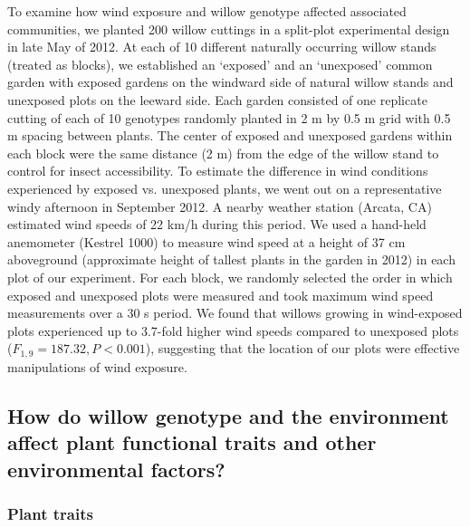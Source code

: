 \documentclass[11pt]{article}
\begin{document}
To examine how wind exposure and willow genotype affected associated
communities, we planted 200 willow cuttings in a
split-plot experimental design in late May of 2012. At each of 10
different naturally occurring willow stands (treated as blocks), we established an
`exposed' and an `unexposed' common garden with exposed gardens on the windward side of natural willow stands and unexposed plots on the leeward side. Each garden consisted of one
replicate cutting of each of 10 genotypes randomly planted in 2 m by 0.5
m grid with 0.5 m spacing between plants. The center of exposed and
unexposed gardens within each block were the same distance (2 m) from
the edge of the willow stand to control for insect accessibility. To
estimate the difference in wind conditions experienced by exposed vs.
unexposed plants, we went out on a representative windy afternoon in
September 2012. A nearby weather station (Arcata, CA) estimated wind speeds of 22
km/h during this period. We used a hand-held anemometer
(Kestrel 1000) to measure wind speed at a height of 37 cm aboveground
(approximate height of tallest plants in the garden in 2012) in each
plot of our experiment. For each block, we randomly selected the order
in which exposed and unexposed plots were measured and took maximum wind
speed measurements over a 30 s period. We found that willows growing in
wind-exposed plots experienced up to 3.7-fold higher wind speeds
compared to unexposed plots (\(F_{1,9}=187.32,P<0.001\)), suggesting that the
location of our plots were effective manipulations of wind exposure.


\subsection*{How do willow genotype and the environment affect plant functional traits and other environmental factors?}

\subsubsection*{Plant traits}
\end{document}
